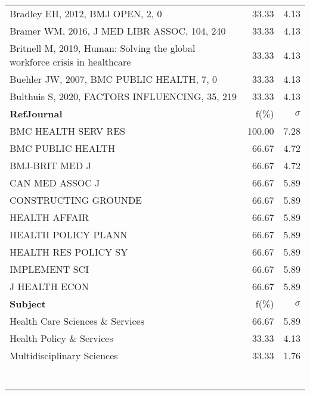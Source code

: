 \documentclass[a4paper,11pt]{report}
\begin{document}
\begin{landscape}
\begin{table}[!ht]
{\begin{tabular}{|p{8cm} r r|}
Bradley EH, 2012, BMJ OPEN, 2, 0 & 33.33 & 4.13\\
Bramer WM, 2016, J MED LIBR ASSOC, 104, 240 & 33.33 & 4.13\\
Britnell M, 2019, Human: Solving the global workforce crisis in healthcare & 33.33 & 4.13\\
Buehler JW, 2007, BMC PUBLIC HEALTH, 7, 0 & 33.33 & 4.13\\
Bulthuis S, 2020, FACTORS INFLUENCING, 35, 219 & 33.33 & 4.13\\
\hline
{\bf RefJournal }& f(\%) & $\sigma$\\
\hline
BMC HEALTH SERV RES & 100.00 & 7.28\\
BMC PUBLIC HEALTH & 66.67 & 4.72\\
BMJ-BRIT MED J & 66.67 & 4.72\\
CAN MED ASSOC J & 66.67 & 5.89\\
CONSTRUCTING GROUNDE & 66.67 & 5.89\\
HEALTH AFFAIR & 66.67 & 5.89\\
HEALTH POLICY PLANN & 66.67 & 5.89\\
HEALTH RES POLICY SY & 66.67 & 5.89\\
IMPLEMENT SCI & 66.67 & 5.89\\
J HEALTH ECON & 66.67 & 5.89\\
\hline
{\bf Subject }& f(\%) & $\sigma$\\
\hline
Health Care Sciences \& Services & 66.67 & 5.89\\
Health Policy \& Services & 33.33 & 4.13\\
Multidisciplinary Sciences & 33.33 & 1.76\\
 &  & \\
 &  & \\
 &  & \\
 &  & \\
 &  & \\
 &  & \\
 &  & \\
\hline
\end{tabular}
}
\end{table}

\clearpage


\end{landscape}
\end{document}
